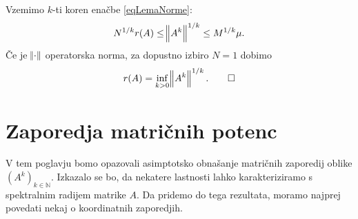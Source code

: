 \documentclass[mat1]{fmfdelo}
\newcommand{\N}{\mathbb N}
\begin{document}
\begin{dokaz}
    Vzemimo $k$-ti koren enačbe \eqref{eqLemaNorme}:
    \begin{equation*}
        N^{1/k} r(A) \leq \norm{A^k}^{1/k} \leq M^{1/k} \mu.
    \end{equation*}
    Če je $\norm{\cdot}$ operatorska norma, za dopustno izbiro $N = 1$ dobimo
    \[r(A) = \inf_{k > 0} \norm{A^k}^{1/k}. \qedhere\]
\end{dokaz}


\section{Zaporedja matričnih potenc}
V tem poglavju bomo opazovali asimptotsko obnašanje matričnih zaporedij oblike $(A^k)_{k\in\N}$. Izkazalo se bo, da nekatere lastnosti lahko karakteriziramo s spektralnim radijem matrike $A$. Da pridemo do tega rezultata, moramo najprej povedati nekaj o koordinatnih zaporedjih.
\end{document}
